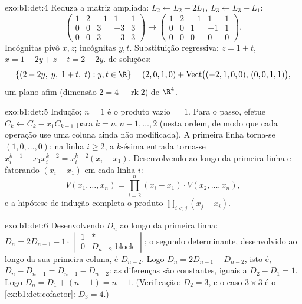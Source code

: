 \begin{solution}{exo:b1:det:4}
Reduza a matriz ampliada: $L_2 \leftarrow L_2 - 2L_1$, $L_3
\leftarrow L_3 - L_1$:
\[
\begin{pmatrix}
1 & 2 & -1 & 1 & 1\\
0 & 0 & 3 & -3 & 3\\
0 & 0 & 3 & -3 & 3
\end{pmatrix}
\to
\begin{pmatrix}
1 & 2 & -1 & 1 & 1\\
0 & 0 & 1 & -1 & 1\\
0 & 0 & 0 & 0 & 0
\end{pmatrix}.
\]
Incógnitas pivô $x, z$; incógnitas  $y, t$. Substituição
regressiva: $z =
1 + t$, $x = 1 - 2y + z - t = 2 - 2y$.  de soluções:
\[
\{(2 - 2y,\; y,\; 1 + t,\; t) : y, t \in \R\}
= (2, 0, 1, 0) + \operatorname{Vect}\bigl((-2,1,0,0),\,
(0,0,1,1)\bigr),
\]
um plano afim (dimensão $2 = 4 - \operatorname{rk} 2$) de $\R^4$.
\end{solution}

\begin{solution}{exo:b1:det:5}
Indução; $n = 1$ é o produto vazio $= 1$. Para o passo, efetue
$C_k \leftarrow C_k - x_1 C_{k-1}$ para $k = n, n-1, \dots, 2$ (nesta ordem, de modo que cada operação use uma
coluna ainda não modificada). A primeira linha torna-se $(1, 0, \dots, 0)$; na
linha $i \geq 2$, a $k$-ésima entrada torna-se $x_i^{k-1} - x_1 x_i^{k-2} = x_i^{k-2}(x_i - x_1)$. Desenvolvendo ao
longo da primeira linha e fatorando $(x_i - x_1)$ em cada linha $i$:
\[
V(x_1, \dots, x_n)
= \prod_{i=2}^{n} (x_i - x_1)\cdot V(x_2, \dots, x_n),
\]
e a hipótese de indução completa o produto $\prod_{i<j}(x_j
- x_i)$.
\end{solution}

\begin{solution}{exo:b1:det:6}
Desenvolvendo $D_n$ ao longo da primeira linha: $D_n = 2 D_{n-1} -
1\cdot\begin{vmatrix} 1 & \ast\\ 0 & D_{n-2}\text{-block}
\end{vmatrix}$; o segundo
determinante, desenvolvido ao longo da sua primeira coluna, é
$D_{n-2}$. Logo $D_n = 2D_{n-1} - D_{n-2}$, isto é, $D_n -
D_{n-1} = D_{n-1} - D_{n-2}$: as diferenças são constantes,
iguais a $D_2 - D_1 = 1$. Logo $D_n = D_1 + (n - 1) = n + 1$. (Verificação: $D_2 = 3$, e o caso $3\times3$
é o \cref{ex:b1:det:cofactor}: $D_3 = 4$.)
\end{solution}

